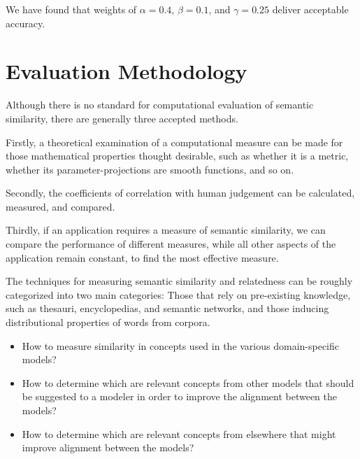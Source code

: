 \documentclass{article}
\begin{document}
We have found that weights of $ \alpha = 0.4 $, $ \beta = 0.1 $, and $ \gamma = 0.25 $ deliver acceptable accuracy.

\section{Evaluation Methodology}

Although there is no standard for computational evaluation of semantic similarity, there are generally three accepted methods.\cite{meng2013review}

Firstly, a theoretical examination of a computational measure can be made for those mathematical properties thought desirable, such as whether it is a metric, whether its parameter-projections are smooth functions, and so on. %

Secondly, the coefficients of correlation with human judgement can be calculated, measured, and compared.\cite{zhou2008new,seco2004intrinsic}

Thirdly, if an application requires a measure of semantic similarity, we can compare the performance of different measures, while all other aspects of the application remain constant, to find the most effective measure.\cite{blanchard2006tree,budanitsky2006evaluating}

The techniques for measuring semantic similarity and relatedness can be roughly categorized into two main categories:\cite{agirre2009study} Those that rely on pre-existing knowledge, such as thesauri, encyclopedias, and semantic networks,\cite{alvarez2007graph,yang2005measuring,hughes2007lexical} and those inducing distributional properties of words from corpora.\cite{sahami2006web,chen2006novel,bollegala2007measuring}


\begin{itemize}
	\item How to measure similarity in concepts used in the various domain-specific models?
	\item How to determine which are relevant concepts from other models that should be suggested to a modeler in order to improve the alignment between the models?
	\item How to determine which are relevant concepts from elsewhere that might improve alignment between the models?
\end{itemize}
\end{document}
